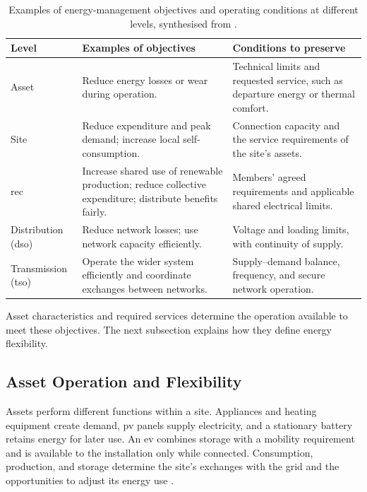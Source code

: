 \begin{table}[!htbp]
\centering\small
\caption[Energy-management objectives at different organisational levels]{Examples of energy-management objectives and operating conditions at different levels, synthesised from \textcite{hussain2023flexibility,moret2019energycollectives,reis2021businessmodels,eu2019electricity}.}
\label{tab:ch2-objectives-levels}
\renewcommand{\arraystretch}{1.16}
\begin{tabularx}{\textwidth}{@{}>{\RaggedRight\arraybackslash}p{}>{\RaggedRight\arraybackslash}X>{\RaggedRight\arraybackslash}X@{}}
\toprule
\textbf{Level} & \textbf{Examples of objectives} & \textbf{Conditions to preserve}\\\midrule
Asset & Reduce energy losses or wear during operation. & Technical limits and requested service, such as departure energy or thermal comfort.\\\addlinespace[6pt]
Site & Reduce expenditure and peak demand; increase local self-consumption. & Connection capacity and the service requirements of the site's assets.\\\addlinespace[6pt]
\gls{rec} & Increase shared use of renewable production; reduce collective expenditure; distribute benefits fairly. & Members' agreed requirements and applicable shared electrical limits.\\\addlinespace[6pt]
Distribution (\gls{dso}) & Reduce network losses; use network capacity efficiently. & Voltage and loading limits, with continuity of supply.\\\addlinespace[6pt]
Transmission (\gls{tso}) & Operate the wider system efficiently and coordinate exchanges between networks. & Supply--demand balance, frequency, and secure network operation.\\
\bottomrule
\end{tabularx}
\end{table}

Asset characteristics and required services determine the operation available to meet these objectives. The next subsection explains how they define energy flexibility.

\subsection{Asset Operation and Flexibility}
\label{sec:ch2-rec-flexibility}

Assets perform different functions within a site. Appliances and heating equipment create demand, \gls{pv} panels supply electricity, and a stationary battery retains energy for later use. An \gls{ev} combines storage with a mobility requirement and is available to the installation only while connected. Consumption, production, and storage determine the site's exchanges with the grid and the opportunities to adjust its energy use \parencite{hussain2023flexibility,siksnys2019flexoffers}.

